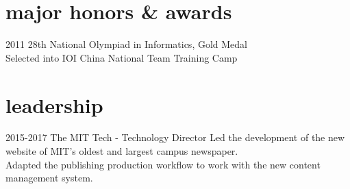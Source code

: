 \documentclass[]{friggeri-cv} %
\begin{document}

\section{major honors \& awards}

\begin{entrylist}
  \centry
  {2011}
  {28th National Olympiad in Informatics, Gold Medal \\
  Selected into IOI China National Team Training Camp}
\end{entrylist}



\section{leadership}

\begin{entrylist}
  \entry
  {2015-2017}
  {The MIT Tech - Technology Director}
  {}
  {Led the development of the new website of MIT's oldest and largest campus newspaper. \\
  Adapted the publishing production workflow to work with the new content management system. }
\end{entrylist}
\end{document}
